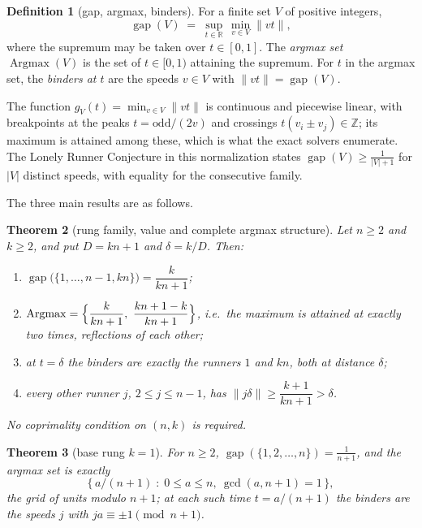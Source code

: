 \documentclass[11pt,a4paper]{article}
\theoremstyle{plain}
\newtheorem{theorem}{Theorem}[section]
\theoremstyle{definition}
\newtheorem{definition}[theorem]{Definition}
\theoremstyle{remark}
\newcommand{\norm}[1]{\lVert #1 \rVert}
\newcommand{\gap}{\operatorname{gap}}
\newcommand{\R}{\mathbb{R}}
\newcommand{\Z}{\mathbb{Z}}
\begin{document}
\begin{definition}[gap, argmax, binders]\label{def:gap}
For a finite set $V$ of positive integers,
\[
  \gap(V) \;=\; \sup_{t \in \R}\, \min_{v \in V} \norm{vt},
\]
where the supremum may be taken over $t \in [0,1]$. The \emph{argmax set}
$\operatorname{Argmax}(V)$ is the set of $t \in [0,1)$ attaining the
supremum. For $t$ in the argmax set, the \emph{binders at $t$} are the
speeds $v \in V$ with $\norm{vt} = \gap(V)$.
\end{definition}

The function $g_V(t) = \min_{v \in V} \norm{vt}$ is continuous and piecewise
linear, with breakpoints at the peaks $t = \text{odd}/(2v)$ and crossings
$t(v_i \pm v_j) \in \Z$; its maximum is attained among these, which is what
the exact solvers enumerate. The Lonely Runner Conjecture in this
normalization states $\gap(V) \ge \tfrac{1}{|V|+1}$ for $|V|$ distinct
speeds, with equality for the consecutive family.

The three main results are as follows.

\begin{theorem}[rung family, value and complete argmax structure]
\label{thm:rung}
Let $n \ge 2$ and $k \ge 2$, and put $D = kn + 1$ and $\delta = k/D$.
Then:
\begin{enumerate}[label=\rm(\roman*), leftmargin=*]
\item $\gap\bigl(\{1, \dots, n-1, kn\}\bigr) = \dfrac{k}{kn+1}$;
\item $\operatorname{Argmax} = \Bigl\{ \dfrac{k}{kn+1},\ %
     \dfrac{kn+1-k}{kn+1} \Bigr\}$, i.e.\ the maximum is attained at
     exactly two times, reflections of each other;
\item at $t = \delta$ the binders are exactly the runners $1$ and $kn$,
     both at distance $\delta$;
\item every other runner $j$, $2 \le j \le n-1$, has
     $\norm{j\delta} \ge \dfrac{k+1}{kn+1} > \delta$.
\end{enumerate}
No coprimality condition on $(n,k)$ is required.
\end{theorem}

\begin{theorem}[base rung $k=1$]\label{thm:base}
For $n \ge 2$,
$\gap(\{1, 2, \dots, n\}) = \tfrac{1}{n+1}$, and the argmax set is exactly
\[
  \bigl\{\, a/(n+1) \;:\; 0 \le a \le n,\ \gcd(a, n+1) = 1 \,\bigr\},
\]
the grid of \emph{units} modulo $n+1$; at each such time $t = a/(n+1)$ the
binders are the speeds $j$ with $ja \equiv \pm 1 \pmod{n+1}$.
\end{theorem}
\end{document}
